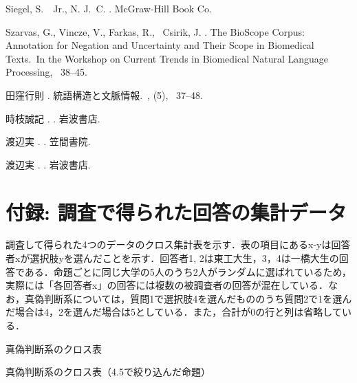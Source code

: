 \documentclass[japanese]{jnlp_1.4}
\begin{document}
\begin{thebibliography}{}
Siegel, S.\BBACOMMA\ \BBA\ Jr., N. J.~C. \BBCP.
\newblock McGraw-Hill Book Co.

Szarvas, G., Vincze, V., Farkas, R., \BBA\ Csirik, J. \BBCP.
\newblock \BBOQ The BioScope Corpus: Annotation for Negation and Uncertainty
  and Their Scope in Biomedical Texts.\BBCQ\
\newblock In {\Bem the Workshop on Current Trends in Biomedical Natural
  Language Processing}, \mbox{\BPGS\ 38--45}.

田窪行則 \BBCP.
\newblock 統語構造と文脈情報.\
\newblock {}, {}  (5), \mbox{\BPGS\ 37--48}.

時枝誠記 \BBCP.
\newblock \Jem{國語學原論}.
\newblock 岩波書店.

渡辺実 \BBCP.
\newblock \Jem{国語文法論}.
\newblock 笠間書院.

渡辺実 \BBCP.
\newblock \Jem{日本語概説}.
\newblock 岩波書店.

\end{thebibliography}


\section*{付録: 調査で得られた回答の集計データ}

調査して得られた4つのデータのクロス集計表を示す．表の項目にあるx-yは回答者xが選択肢yを選んだことを示す．回答者1, 2は東工大生，3，4は一橋大生の回答である．命題ごとに同じ大学の5人のうち2人がランダムに選ばれているため，実際には「各回答者x」の回答には複数の被調査者の回答が混在している．なお，真偽判断系については，質問1で選択肢4を選んだもののうち質問2で1を選んだ場合は4，2を選んだ場合は5としている．また，合計が0の行と列は省略している．

\begin{table}[b]
\caption{真偽判断系のクロス表}

\vspace{1\baselineskip}
\end{table}



\begin{table}[b]
\caption{真偽判断系のクロス表（4.5で絞り込んだ命題）}

\end{table}
\end{document}
